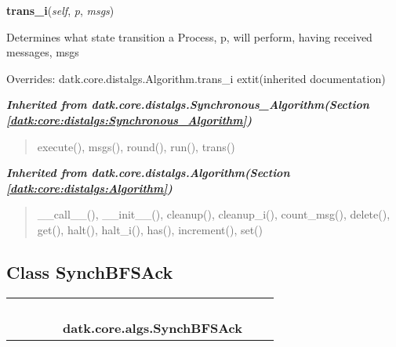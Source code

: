     \vspace{0.5ex}

\hspace{.8\funcindent}\begin{boxedminipage}{\funcwidth}

    \raggedright \textbf{trans\_i}(\textit{self}, \textit{p}, \textit{msgs})

\setlength{\parskip}{2ex}
    Determines what state transition a Process, p, will perform, having 
    received messages, msgs

\setlength{\parskip}{1ex}
      Overrides: datk.core.distalgs.Algorithm.trans\_i 	extit{(inherited documentation)}

    \end{boxedminipage}


\large{\textbf{\textit{Inherited from datk.core.distalgs.Synchronous\_Algorithm\textit{(Section \ref{datk:core:distalgs:Synchronous_Algorithm})}}}}

\begin{quote}
execute(), msgs(), round(), run(), trans()
\end{quote}

\large{\textbf{\textit{Inherited from datk.core.distalgs.Algorithm\textit{(Section \ref{datk:core:distalgs:Algorithm})}}}}

\begin{quote}
\_\_call\_\_(), \_\_init\_\_(), cleanup(), cleanup\_i(), count\_msg(), delete(), get(), halt(), halt\_i(), has(), increment(), set()
\end{quote}


\subsection{Class SynchBFSAck}

    \label{datk:core:algs:SynchBFSAck}
\begin{tabular}{cccccccc}
\multicolumn{2}{r}{\settowidth{\BCL}{datk.core.distalgs.Algorithm}\multirow{2}{\BCL}{datk.core.distalgs.Algorithm}}
&&
&&
  \\\cline{3-3}
  &&\multicolumn{1}{c|}{}
&&
&&
  \\
\multicolumn{4}{r}{\settowidth{\BCL}{datk.core.distalgs.Synchronous\_Algorithm}\multirow{2}{\BCL}{datk.core.distalgs.Synchronous\_Algorithm}}
&&
  \\\cline{5-5}
  &&&&\multicolumn{1}{c|}{}
&&
  \\
&&&&\multicolumn{2}{l}{\textbf{datk.core.algs.SynchBFSAck}}
\end{tabular}

